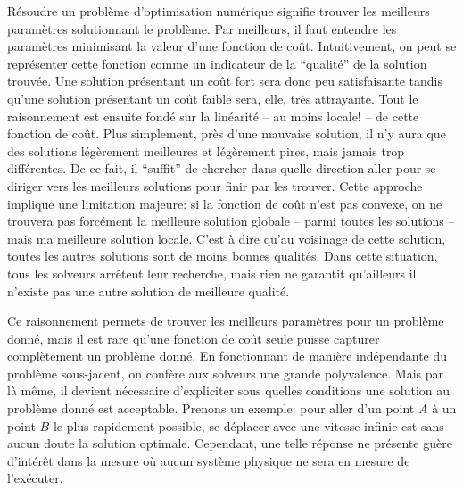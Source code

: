 Résoudre un problème d'optimisation numérique signifie trouver les
meilleurs paramètres solutionnant le problème. Par meilleurs, il faut
entendre les paramètres minimisant la valeur d'une fonction de
coût. Intuitivement, on peut se représenter cette fonction comme un
indicateur de la ``qualité'' de la solution trouvée. Une solution
présentant un coût fort sera donc peu satisfaisante tandis qu'une
solution présentant un coût faible sera, elle, très attrayante. Tout
le raisonnement est ensuite fondé sur la linéarité -- au moins locale!
-- de cette fonction de coût. Plus simplement, près d'une mauvaise
solution, il n'y aura que des solutions légèrement meilleures et
légèrement pires, mais jamais trop différentes. De ce fait, il
``suffit'' de chercher dans quelle direction aller pour se diriger
vers les meilleurs solutions pour finir par les trouver. Cette
approche implique une limitation majeure: si la fonction de coût n'est
pas convexe, on ne trouvera pas forcément la meilleure solution
globale -- parmi toutes les solutions -- mais ma meilleure solution
locale. C'est à dire qu'au voisinage de cette solution, toutes les
autres solutions sont de moins bonnes qualités. Dans cette situation,
tous les solveurs arrêtent leur recherche, mais rien ne garantit
qu'ailleurs il n'existe pas une autre solution de meilleure qualité.


Ce raisonnement permets de trouver les meilleurs paramètres pour un
problème donné, mais il est rare qu'une fonction de coût seule puisse
capturer complètement un problème donné. En fonctionnant de manière
indépendante du problème sous-jacent, on confère aux solveurs une
grande polyvalence. Mais par là même, il devient nécessaire
d'expliciter sous quelles conditions une solution au problème donné
est acceptable. Prenons un exemple: pour aller d'un point $A$ à un
point $B$ le plus rapidement possible, se déplacer avec une vitesse
infinie est sans aucun doute la solution optimale. Cependant, une
telle réponse ne présente guère d'intérêt dans la mesure où aucun
système physique ne sera en mesure de l'exécuter.


